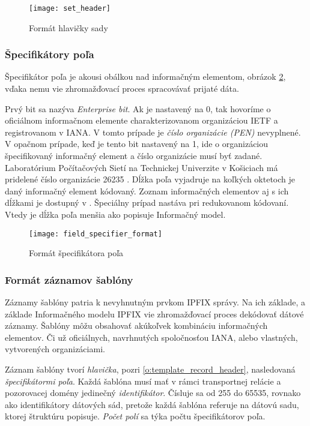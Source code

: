 \begin{figure}[ht!]
\centering
\texttt{[image: set\_header]}
\caption{Formát hlavičky sady}\label{o:set_header}
\end{figure}

\subsubsection{Špecifikátory poľa}

Špecifikátor poľa je akousi obálkou nad informačným elementom, obrázok \ref{o:field_specifier_format}, 
vďaka nemu vie zhromažďovací proces spracovávať prijaté dáta. 

Prvý bit sa nazýva \emph{Enterprise bit}.
Ak je nastavený na 0, tak hovoríme o oficiálnom informačnom elemente charakterizovanom organizáciou IETF a 
registrovanom v IANA. 
V tomto prípade je \emph{číslo organizácie (PEN)} nevyplnené. V opačnom prípade, 
keď je tento bit nastavený na 1, ide o organizáciou špecifikovaný informačný element a číslo organizácie
musí byť zadané. Laboratórium Počítačových Sietí na Technickej Univerzite v Košiciach má pridelené číslo 
organizácie 26235 \citep{pen}.
Dĺžka poľa vyjadruje na koľkých oktetoch je daný informačný element kódovaný. 
Zoznam informačných elementov aj s ich dĺžkami je dostupný v \citep{rfc5102}.
Špeciálny prípad nastáva pri redukovanom kódovaní. Vtedy je dĺžka poľa menšia ako popisuje 
Informačný model. 
 
\begin{figure}[ht!]
\centering
\texttt{[image: field\_specifier\_format]}
\caption{Formát špecifikátora poľa}\label{o:field_specifier_format}
\end{figure}



\subsubsection{Formát záznamov šablóny}

Záznamy šablóny patria k nevyhnutným prvkom IPFIX správy. Na ich základe, a základe Informačného modelu
IPFIX \citep{rfc5102} vie zhromažďovací proces dekódovať dátové záznamy.
Šablóny môžu obsahovať akúkoľvek kombináciu informačných elementov. Či už oficiálnych, navrhnutých 
spoločnosťou IANA, alebo vlastných, vytvorených organizáciami.

Záznam šablóny tvorí \emph{hlavička}, pozri \ref{o:template_record_header}, nasledovaná 
\emph{špecifikátormi poľa}. 
Každá šablóna musí mať v rámci transportnej relácie a pozorovacej domény jedinečný \emph{identifikátor}. 
Čísluje sa od 255 do 65535, rovnako ako identifikátory dátových sád, pretože každá šablóna referuje 
na dátovú sadu, ktorej štruktúru popisuje. \emph{Počet polí} sa týka počtu 
špecifikátorov poľa.


